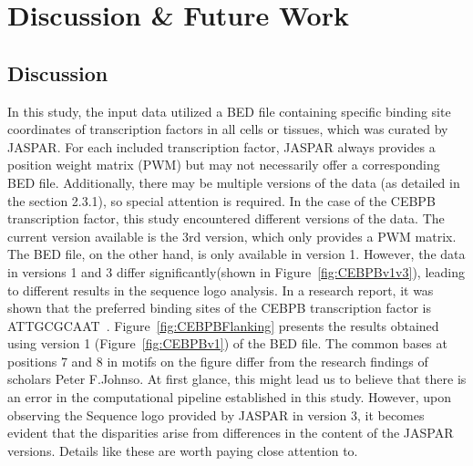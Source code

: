 \documentclass{PHlab-thesis}
\begin{document}
\chapter{Discussion \& Future Work}
\section{Discussion}
In this study, the input data utilized a BED file containing specific binding site coordinates of transcription factors in all cells or tissues, which was curated by JASPAR. For each included transcription factor, JASPAR always provides a position weight matrix (PWM) but may not necessarily offer a corresponding BED file. Additionally, there may be multiple versions of the data (as detailed in the section 2.3.1), so special attention is required. In the case of the CEBPB transcription factor, this study encountered different versions of the data. The current version available is the 3rd version, which only provides a PWM matrix. The BED file, on the other hand, is only available in version 1. However, the data in versions 1 and 3 differ significantly(shown in Figure~\ref{fig:CEBPBv1v3}), leading to different results in the sequence logo analysis. In a research report, it was shown that the preferred binding sites of the CEBPB transcription factor is ATTGCGCAAT~\cite{johnson1993identification}. Figure~\ref{fig:CEBPBFlanking} presents the results obtained using version 1 (Figure~\ref{fig:CEBPBv1}) of the BED file. The common bases at positions 7 and 8 in motifs on the figure differ from the research findings of scholars Peter F.Johnso. At first glance, this might lead us to believe that there is an error in the computational pipeline established in this study. However, upon observing the Sequence logo provided by JASPAR in version 3, it becomes evident that the disparities arise from differences in the content of the JASPAR versions. Details like these are worth paying close attention to.
\end{document}
